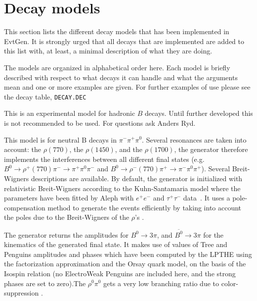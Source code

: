 \section{Decay models}
\label{sect:models}

This section lists the different decay models that has been 
implemented in EvtGen. It is strongly urged that all decays that
are implemented are added to this list with, at least, a minimal 
description of what they are doing. 

The models are organized in alphabetical order here. Each model
is briefly described with respect to what decays it can handle and
what the arguments mean and one or more examples are given. For
further examples of use please see the decay table, {\tt DECAY.DEC}


\label{bhadronic}



\Expl
This is an experimental model for hadronic $B$ decays. Until
further developed this is not recommended to be used. For
questions ask Anders Ryd.


\label{bto3picp}



\Expl
This model is for neutral B decays in $\pi^-\pi^+\pi^0$. 
Several resonances are taken into account: the $\rho(770)$, the $\rho(1450)$, and the $\rho(1700)$, the generator therefore implements the interferences between all different final states (e.g. $B^0 \rightarrow \rho^+(770) \pi^- \rightarrow \pi^+\pi^0\pi^-$ and $B^0 \rightarrow \rho^-(770) \pi^+ \rightarrow \pi^-\pi^0\pi^+$). Several Breit-Wigners descriptions are available. By default, the generator is initialized with relativistic Breit-Wigners according to the Kuhn-Santamaria model where the parameters have been fitted by Aleph with $e^+e^-$ and $\tau^+\tau^-$ data~\cite{AlephRho}.
It uses a pole-compensation method to generate the events efficiently by taking into account the poles due to the Breit-Wigners of the $\rho$'s \cite{3piNote}. 

The generator returns the amplitudes for $B^0 \rightarrow 3\pi$, and $\overline{B^0} \rightarrow 3\pi$ for the kinematics of the generated final state. It makes use of values of Tree and Penguins amplitudes and phases which have
been computed by the LPTHE using the factorization approximation and the Orsay
quark model, on the basis of the Isospin relation (no ElectroWeak Penguins
are included here, and the strong phases are set to zero).The $\rho^0\pi^0$ gets a very low branching ratio due to color-suppression \cite{3piBook}.

